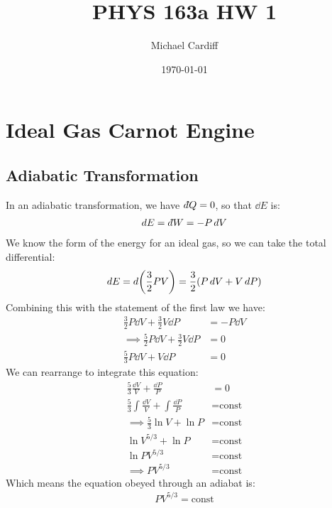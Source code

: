 \documentclass[12pt]{article}
\title{\vspace{-3em}PHYS 163a HW 1}
\author{Michael Cardiff}
\date{\today}
\newcommand{\dbar}{d\hspace*{-0.08em}\bar{}\hspace*{0.1em}}
\begin{document}
\maketitle

\section{Ideal Gas Carnot Engine}

\subsection{Adiabatic Transformation}
In an adiabatic transformation, we have $\dbar Q=0$, so that $\dd{E}$ is:
\begin{align*}
  \dd{E}=\dbar W=-P\dd{V}
\end{align*}
We know the form of the energy for an ideal gas, so we can take the total differential:
\begin{align*}
  \dd{E}=\dd{\qty(\frac{3}{2}PV)}=\frac32(P\dd{V}+V\dd{P})
\end{align*}
Combining this with the statement of the first law we have:
\begin{align*}
  \frac32P\dd{V}+\frac32V\dd{P}&=-P\dd{V}\\
  \implies\frac52P\dd{V}+\frac32V\dd{P}&=0\\
  \frac53P\dd{V}+V\dd{P}&=0
\end{align*}
We can rearrange to integrate this equation:
\begin{align*}
  \frac53\frac{\dd{V}}{V}+\frac{\dd{P}}{P}&=0\\
  \frac53\int\frac{\dd{V}}{V}+\int\frac{\dd{P}}P&=\text{const}\\
  \implies\frac53\ln{V}+\ln{P}&=\text{const}\\
  \ln{V^{5/3}}+\ln{P}&=\text{const}\\
  \ln{PV^{5/3}}&=\text{const}\\
  \implies PV^{5/3}&=\text{const}
\end{align*}
Which means the equation obeyed through an adiabat is:
\begin{align}
  \boxed{PV^{5/3}=\text{const}}
\end{align}
\end{document}
